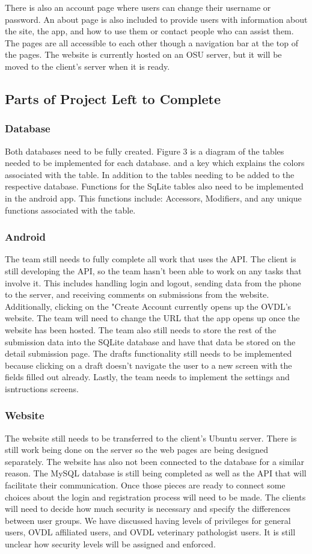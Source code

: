 \documentclass[onecolumn, draftclsnofoot,10pt, compsoc]{IEEEtran}
\begin{document}
There is also an account page where users can change their username or password. An about page is also included to provide users with information about the site, the app, and how to use them or contact people who can assist them. The pages are all accessible to each other though a navigation bar at the top of the pages. The website is currently hosted on an OSU server, but it will be moved to the client's server when it is ready. 


\subsection{Parts of Project Left to Complete}
\subsubsection{Database}
Both databases need to be fully created. Figure 3 is a diagram of the tables needed to be implemented for each database. and a key which explains the colors associated with the table. In addition to the tables needing to be added to the respective database. Functions for the SqLite tables also need to be implemented in the android app. This functions include: Accessors, Modifiers, and any unique functions associated with the table. 
\subsubsection{Android}
The team still needs to fully complete all work that uses the API. The client is still developing the API, so the team hasn't been able to work on any tasks that involve it. This includes handling login and logout, sending 
data from the phone to the server, and receiving comments on submissions from the website. Additionally, clicking on the "Create Account currently opens up the OVDL's website. The team will need to change the URL that the app opens up once the website has been hosted. The team also still needs to store the rest of the submission data into the SQLite database and have that data be stored on the detail submission page. The drafts functionality still needs to be implemented because clicking on a draft doesn't navigate the user to a new screen with the fields filled out already. Lastly, the team needs to implement the settings and isntructions screens.
\subsubsection{Website}
The website still needs to be transferred to the client's Ubuntu server. There is still work being done on the server so the web pages are being designed separately. The website has also not been connected to the database for a similar reason. The MySQL database is still being completed as well as the API that will facilitate their communication. Once those pieces are ready to connect some choices about the login and registration process will need to be made. The clients will need to decide how much security is necessary and specify the differences between user groups. We have discussed having levels of privileges for general users, OVDL affiliated users, and OVDL veterinary pathologist users. It is still unclear how security levels will be assigned and enforced. 
\end{document}
